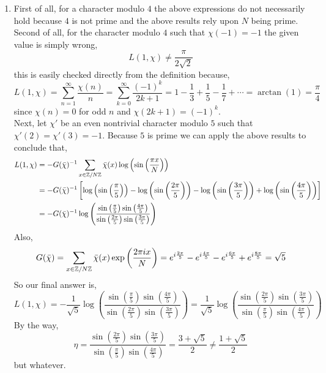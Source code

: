 \documentclass[12pt]{extarticle}
\begin{document}
\begin{enumerate}
\begin{enumerate}
\item First of all, for a character modulo $4$ the above expressions do not necessarily hold because $4$ is not prime and the above results rely upon $N$ being prime. Second of all, for the character modulo $4$ such that $\chi(-1) = -1$ the given value is simply wrong,
\[L(1, \chi) \neq \frac{\pi}{2 \sqrt{2}}\]
this is easily checked directly from the definition because,
\[L(1, \chi) = \sum_{n = 1}^{\infty} \frac{\chi(n)}{n} = \sum_{k = 0}^{\infty} \frac{(-1)^k}{2k + 1} = 1 - \frac{1}{3} + \frac{1}{5} - \frac{1}{7} + \cdots = \arctan{(1)} = \frac{\pi}{4}\]
since $\chi(n) = 0$ for odd $n$ and $\chi(2k + 1) = (-1)^k$. \bigskip \\

Next, let $\chi'$ be an even nontrivial character modulo $5$ such that $\chi'(2) = \chi'(3) = -1$. Because $5$ is prime we can apply the above results to conclude that,
\begin{align*}
L(1, \chi) & = - G(\bar{\chi})^{-1} \sum_{x \in \mathbb{Z} / N \mathbb{Z}} \bar{\chi}(x) \log\left(\sin{\left(\frac{\pi x}{N}\right)}\right) \\ &= - G(\bar{\chi})^{-1} \left[ \log\left(\sin{\left(\frac{\pi}{5}\right)}\right) - \log\left(\sin{\left(\frac{2\pi}{5}\right)}\right) - \log\left(\sin{\left(\frac{3\pi}{5}\right)}\right) + \log\left(\sin{\left(\frac{4\pi}{5}\right)}\right) \right]  \\ & = - G(\bar{\chi})^{-1} \log \left(\frac{ \sin{\left(\frac{\pi}{5}\right)} \sin{\left(\frac{4\pi}{5}\right)}}{\sin{\left(\frac{2\pi}{5}\right)} \sin{\left(\frac{3\pi}{5}\right)}}  \right)
\end{align*}
Also,
\begin{align*} 
G(\bar{\chi}) = \sum_{x \in \mathbb{Z} / N \mathbb{Z}} \bar{\chi}(x) \exp{\left(\frac{2\pi i x}{N}\right)} = e^{i \frac{2\pi}{5}} - e^{i \frac{4\pi}{5}} - e^{i \frac{6\pi}{5}} + e^{i \frac{8\pi}{5}} = \sqrt{5}  
\end{align*}
So our final answer is,
\[L(1, \chi) = - \frac{1}{\sqrt{5}} \log \left(\frac{ \sin{\left(\frac{\pi}{5}\right)} \sin{\left(\frac{4\pi}{5}\right)}}{\sin{\left(\frac{2\pi}{5}\right)} \sin{\left(\frac{3\pi}{5}\right)}}  \right) = \frac{1}{\sqrt{5}} \log \left(\frac{\sin{\left(\frac{2\pi}{5}\right)} \sin{\left(\frac{3\pi}{5}\right)}}{ \sin{\left(\frac{\pi}{5}\right)} \sin{\left(\frac{4\pi}{5}\right)}}  \right) \]
By the way, 
\[ \eta = \frac{\sin{\left(\frac{2\pi}{5}\right)} \sin{\left(\frac{3\pi}{5}\right)}}{ \sin{\left(\frac{\pi}{5}\right)} \sin{\left(\frac{4\pi}{5}\right)}} = \frac{3 + \sqrt{5}}{2} \neq \frac{1 + \sqrt{5}}{2}\]
but whatever.
\end{enumerate} 
\end{enumerate}
\end{document}

